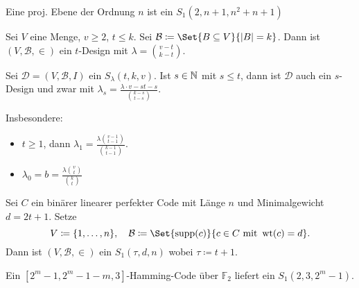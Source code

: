 \documentclass{cheat-sheet}
\newcommand{\F}{\mathbb{F}} %
\DeclareMathOperator{\wt}{wt} %
\newcommand{\Design}{\mathcal{D}} %
\newcommand{\Blocks}{\mathcal{B}} %
\begin{document}
\begin{bsp}
  Eine proj. Ebene der Ordnung $n$ ist ein $S_1(2, n + 1, n^2 + n + 1)$
\end{bsp}

\begin{bsp}
  Sei $V$ eine Menge, $v \geq 2$, $t \leq k$.
  Sei $\Blocks \coloneqq \Set{B \subseteq V}{\abs{B} = k}$.
  Dann ist $(V, \Blocks, {\in})$ ein $t$-Design mit $\lambda = {v - t \choose k - t}$.
\end{bsp}

\begin{prop}
  Sei $\Design = (V, \Blocks, I)$ ein $S_\lambda(t, k, v)$.
  Ist $s \in \mathbb{N}$ mit $s \leq t$, dann ist $\Design$ auch ein $s$-Design und zwar mit $\lambda_s = \frac{\lambda \cdot {v -s t-s}}{{k-s \choose t-s}}$.
\end{prop}

\begin{bem}
  Insbesondere:
  \begin{itemize}
    \item $t \geq 1$, dann $\lambda_1 = \frac{\lambda {v-1 \choose t-1}}{{k-1 \choose t-1}}$.
    \item $\lambda_0 = b = \frac{\lambda {v \choose t}}{{k \choose t}}$
  \end{itemize}
\end{bem}

\begin{satz}
  Sei $C$ ein binärer linearer perfekter Code mit Länge $n$ und Minimalgewicht $d = 2t+1$.
  Setze
  \[
    V \coloneqq \{ 1, \ldots, n \}, \quad
    \Blocks \coloneqq \Set{\supp(c)}{c \in C \text{ mit } \wt(c) = d}.
  \]
  Dann ist $(V, \Blocks, {\in})$ ein $S_1(\tau, d, n)$ wobei $\tau \coloneqq t+1$.
\end{satz}

\begin{bsp}
  Ein $[2^m-1, 2^m-1-m, 3]$-Hamming-Code über $\F_2$ liefert ein $S_1(2, 3, 2^m-1)$.
  
  
\end{bsp}
\end{document}
